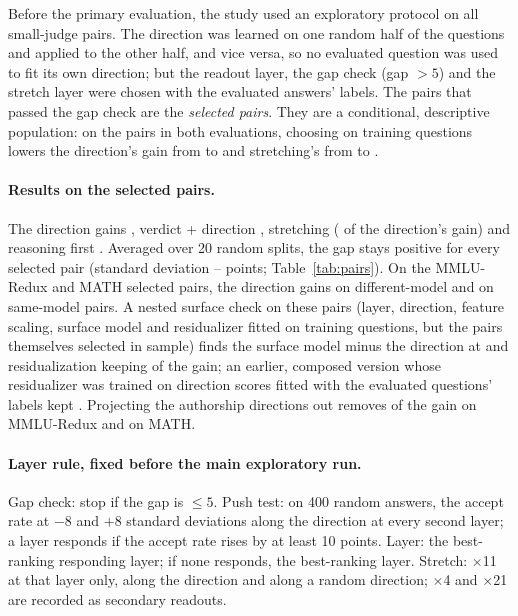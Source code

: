 Before the primary evaluation, the study used an exploratory protocol on all  small-judge pairs. The direction was learned on one random half of the questions and applied to the other half, and vice versa, so no evaluated question was used to fit its own direction; but the readout layer, the gap check (gap $>5$) and the stretch layer were chosen with the evaluated answers' labels. The  pairs that passed the gap check are the \emph{selected pairs}. They are a conditional, descriptive population: on the  pairs in both evaluations, choosing on training questions lowers the direction's gain from  to  and stretching's from  to .

\paragraph{Results on the selected pairs.} The direction gains , verdict + direction , stretching  ( of the direction's gain) and reasoning first . Averaged over 20 random splits, the gap stays positive for every selected pair (standard deviation -- points; Table~\ref{tab:pairs}). On the MMLU-Redux and MATH selected pairs, the direction gains  on different-model and  on same-model pairs. A nested surface check on these pairs (layer, direction, feature scaling, surface model and residualizer fitted on training questions, but the pairs themselves selected in sample) finds the surface model minus the direction at  and residualization keeping  of the gain; an earlier, composed version whose residualizer was trained on direction scores fitted with the evaluated questions' labels kept . Projecting the authorship directions out removes  of the gain on MMLU-Redux and  on MATH.

\paragraph{Layer rule, fixed before the main exploratory run.} Gap check: stop if the gap is $\le 5$. Push test: on 400 random answers, the accept rate at $-8$ and $+8$ standard deviations along the direction at every second layer; a layer responds if the accept rate rises by at least 10 points. Layer: the best-ranking responding layer; if none responds, the best-ranking layer. Stretch: $\times$11 at that layer only, along the direction and along a random direction; $\times$4 and $\times$21 are recorded as secondary readouts.

